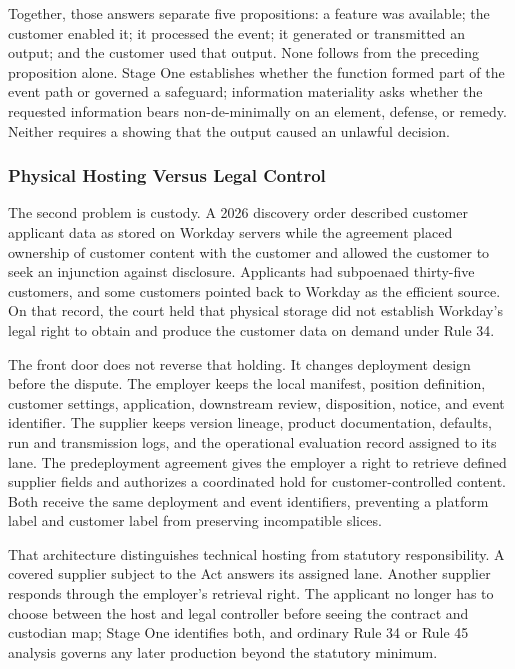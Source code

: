 Together, those answers separate five propositions: a feature was available; the customer enabled it; it processed the event; it generated or transmitted an output; and the customer used that output. None follows from the preceding proposition alone. Stage One establishes whether the function formed part of the event path or governed a safeguard; information materiality asks whether the requested information bears non-de-minimally on an element, defense, or remedy. Neither requires a showing that the output caused an unlawful decision.

\subsubsection{Physical Hosting Versus Legal Control}

The second problem is custody. A 2026 discovery order described customer applicant data as stored on Workday servers while the agreement placed ownership of customer content with the customer and allowed the customer to seek an injunction against disclosure. Applicants had subpoenaed thirty-five customers, and some customers pointed back to Workday as the efficient source. On that record, the court held that physical storage did not establish Workday's legal right to obtain and produce the customer data on demand under Rule 34.

The front door does not reverse that holding. It changes deployment design before the dispute. The employer keeps the local manifest, position definition, customer settings, application, downstream review, disposition, notice, and event identifier. The supplier keeps version lineage, product documentation, defaults, run and transmission logs, and the operational evaluation record assigned to its lane. The predeployment agreement gives the employer a right to retrieve defined supplier fields and authorizes a coordinated hold for customer-controlled content. Both receive the same deployment and event identifiers, preventing a platform label and customer label from preserving incompatible slices.

That architecture distinguishes technical hosting from statutory responsibility. A covered supplier subject to the Act answers its assigned lane. Another supplier responds through the employer's retrieval right. The applicant no longer has to choose between the host and legal controller before seeing the contract and custodian map; Stage One identifies both, and ordinary Rule 34 or Rule 45 analysis governs any later production beyond the statutory minimum.

